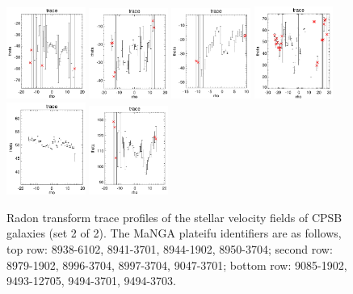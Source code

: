 \documentclass[fleqn,usenatbib]{mnras}
\begin{document}
\begin{figure}
    \includegraphics[width=0.23\textwidth]{Images/trace-plots/trace-plots-cpsbs/8997-3704.png}
    \includegraphics[width=0.23\textwidth]{Images/trace-plots/trace-plots-cpsbs/9047-3701.png}
    \includegraphics[width=0.23\textwidth]{Images/trace-plots/trace-plots-cpsbs/9085-1902.png}
    \includegraphics[width=0.23\textwidth]{Images/trace-plots/trace-plots-cpsbs/9493-12705.png}
    \includegraphics[width=0.23\textwidth]{Images/trace-plots/trace-plots-cpsbs/9494-3701.png}
    \includegraphics[width=0.23\textwidth]{Images/trace-plots/trace-plots-cpsbs/9494-3703.png}
    \caption{Radon transform trace profiles of the stellar velocity fields of CPSB galaxies (set 2 of 2). The MaNGA plateifu identifiers are as follows, top row: 8938-6102, 8941-3701, 8944-1902, 8950-3704; second row: 8979-1902, 8996-3704, 8997-3704, 9047-3701; bottom row: 9085-1902, 9493-12705, 9494-3701, 9494-3703.}
    \label{fig:Radon-traces-CPSBs-2}
\end{figure}
\end{document}
